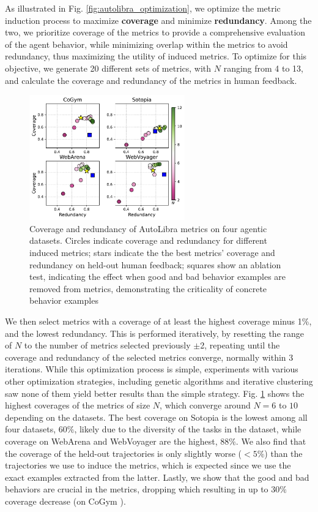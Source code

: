 As illustrated in Fig. \ref{fig:autolibra_optimization}, we optimize the metric induction process to maximize \textbf{coverage} and minimize \textbf{redundancy}.
Among the two, we prioritize coverage of the metrics to provide a comprehensive evaluation of the agent behavior, while minimizing overlap within the metrics to avoid redundancy, thus maximizing the utility of induced metrics.
To optimize for this objective, we generate 20 different sets of metrics, with $N$ ranging from 4 to 13,
and calculate the coverage and redundancy of the metrics in human feedback.
\begin{figure}
\vspace{-10pt}
    \includegraphics[width=0.6\textwidth]{figs/four_datasets_grid.pdf}
    \vspace{-15pt}  
    \caption{Coverage and redundancy of AutoLibra metrics on four agentic datasets. Circles indicate coverage and redundancy for different induced metrics; stars indicate the the best metrics' coverage and redundancy on held-out human feedback; squares show an ablation test, indicating the effect when good and bad behavior examples are removed from metrics, demonstrating the criticality of concrete behavior examples}
    \label{fig:coverage-redundancy}
\end{figure}
We then select metrics with a coverage of at least the highest coverage minus 1\%,
and the lowest redundancy.
This is performed iteratively, by resetting the range of $N$ to the number of metrics selected
previously $\pm$2, repeating until the coverage and redundancy
of the selected metrics converge, normally within 3 iterations.
While this optimization process is simple, experiments with various other optimization
strategies, including genetic algorithms and iterative clustering saw none of them
yield better results than the simple strategy.
Fig. \ref{fig:coverage-redundancy} shows the highest coverages of the metrics of size $N$, which converge around $N=6$ to $10$ depending on the datasets. The best coverage on Sotopia \citep{zhousotopia} is the lowest among all four datasets, $60\%$, likely due to the diversity of the tasks in the dataset, while coverage on WebArena \citep{zhouwebarena} and WebVoyager \citep{he2024webvoyager} are the highest, $88\%$. We also find that the coverage of the held-out trajectories is only slightly worse ($<5\%$) than the trajectories we use to induce the metrics, which is expected since we use the exact examples extracted from the latter. Lastly, we show that the good and bad behaviors are crucial in the metrics, dropping which resulting in up to $30\%$ coverage decrease (on CoGym \citep{shao2024collaborative}).
